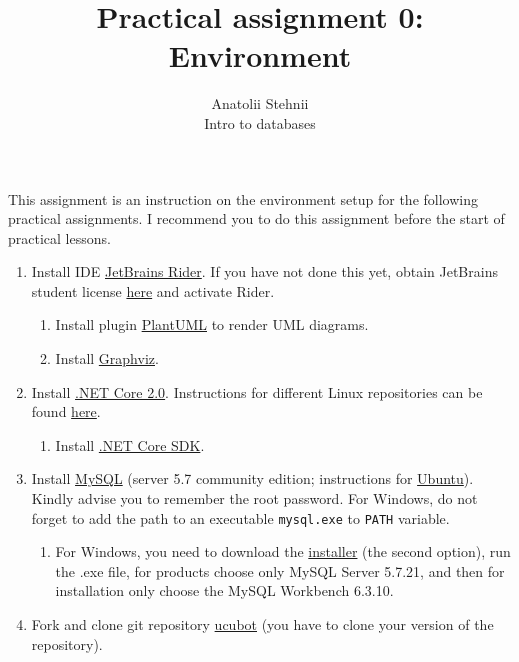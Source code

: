 \documentclass[12pt]{article}
\newcommand{\code}[1]{\texttt{#1}}
\begin{document}
\title{Practical assignment 0: Environment}
\author{Anatolii Stehnii\\Intro to databases}
\maketitle

This assignment is an instruction on the environment setup for the following practical assignments. I recommend you to do this assignment before the start of practical lessons.

\begin{enumerate}
\item Install IDE \href{https://www.jetbrains.com/rider/download/}{JetBrains Rider}. If you have not done this yet, obtain JetBrains student license \href{https://www.jetbrains.com/student/}{here} and activate Rider.
\begin{enumerate}
\item Install plugin \href{https://plugins.jetbrains.com/plugin/7017-plantuml-integration}{PlantUML} to render UML diagrams.
\item Install \href{http://www.graphviz.org/download/}{Graphviz}.
\end{enumerate}
\item Install \href{https://www.microsoft.com/net/learn/get-started}{.NET Core 2.0}. Instructions for different Linux repositories can be found  \href{https://docs.microsoft.com/ru-ru/dotnet/core/linux-prerequisites?tabs=netcore2x}{here}.
\begin{enumerate}
\item Install \href{https://github.com/dotnet/core/blob/master/release-notes/download-archives/1.0.4-sdk-download.md}{.NET Core SDK}.
\end{enumerate}
\item Install \href{https://www.mysql.com/}{MySQL} (server 5.7 community edition; instructions for \href{https://www.digitalocean.com/community/tutorials/how-to-install-mysql-on-ubuntu-16-04}{Ubuntu}). Kindly advise you to remember the root password. For Windows, do not forget to add the path to an executable \code{mysql.exe} to \code{PATH} variable.
\begin{enumerate}
\item For Windows, you need to download the \href{https://dev.mysql.com/downloads/installer/}{installer} (the second option), run the .exe file, for products choose only MySQL Server 5.7.21, and then for installation only choose the MySQL Workbench 6.3.10.
\end{enumerate}
\item Fork and clone git repository \href{https://github.com/tsdaemon/ucubot}{ucubot} (you have to clone your version of the repository).

\end{enumerate}
\end{document}
